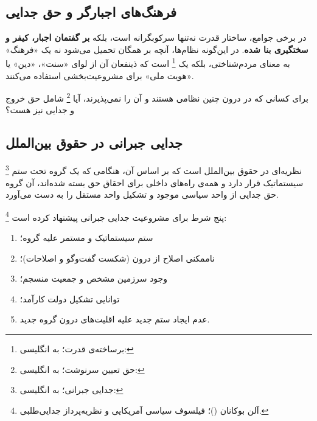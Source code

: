 \subsection{فرهنگ‌های اجبارگر و حق جدایی}
\label{subsec:ch02-t4-oppressive}

در برخی جوامع، ساختار قدرت نه‌تنها سرکوبگرانه است، بلکه
\textbf{بر گفتمان اجبار، کیفر و سختگیری بنا شده}. در این‌گونه
نظام‌ها، آنچه بر همگان تحمیل می‌شود نه یک «فرهنگ» به معنای
مردم‌شناختی، بلکه یک %
\footnote{برساخته‌ی قدرت؛ به انگلیسی: }%
است که ذینفعان آن از لوای «سنت»، «دین» یا «هویت ملی» برای
مشروعیت‌بخشی استفاده می‌کنند.

برای کسانی که در درون چنین نظامی هستند و آن را نمی‌پذیرند، آیا
%
\footnote{حق تعیین سرنوشت؛ به انگلیسی:
	}%
شامل حق خروج و جدایی نیز هست؟

\subsection{جدایی جبرانی در حقوق بین‌الملل}
\label{subsec:ch02-t4-remedial}

\begin{tcolorbox}[legalbox, title={مفهوم: جدایی جبرانی}]
	\footnote{جدایی جبرانی؛ به انگلیسی: }%
	نظریه‌ای در حقوق بین‌الملل است که بر اساس آن، هنگامی که یک گروه
	تحت ستم سیستماتیک قرار دارد و همه‌ی راه‌های داخلی برای احقاق حق
	بسته شده‌اند، آن گروه حق جدایی از واحد سیاسی موجود و تشکیل
	واحد مستقل را به دست
	می‌آورد.
\end{tcolorbox}

%
\footnote{%
	آلن بوکانان ()؛%
	فیلسوف سیاسی آمریکایی و نظریه‌پرداز جدایی‌طلبی.%
}%
پنج شرط برای مشروعیت جدایی جبرانی پیشنهاد کرده
است:

\begin{enumerate}[label=\textbf{\arabic*.}, nosep, rightmargin=1em]
	\item ستم سیستماتیک و مستمر علیه گروه؛
	\item ناممکنی اصلاح از درون (شکست گفت‌وگو و اصلاحات)؛
	\item وجود سرزمین مشخص و جمعیت منسجم؛
	\item توانایی تشکیل دولت کارآمد؛
	\item عدم ایجاد ستم جدید علیه اقلیت‌های درون گروه جدید.
\end{enumerate}

